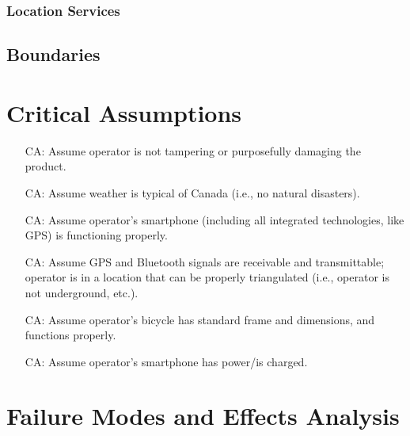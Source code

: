 \documentclass{article}
\newcounter{canum} %
\begin{document}
\subsubsection {Location Services}
\subsection {Boundaries}


\section{Critical Assumptions}

\begin{itemize}

\item[CA\refstepcounter{canum}\thecanum\label{CA1}:] Assume operator is not tampering or purposefully damaging the product.
\item[CA\refstepcounter{canum}\thecanum\label{CA2}:] Assume weather is typical of Canada (i.e., no natural disasters).
\item[CA\refstepcounter{canum}\thecanum\label{CA3}:] Assume operator's smartphone (including all integrated technologies, like GPS) is functioning properly.
\item[CA\refstepcounter{canum}\thecanum\label{CA4}:] Assume GPS and Bluetooth signals are receivable and transmittable; operator is in a location that can be properly triangulated (i.e., operator is not underground, etc.). 
\item[CA\refstepcounter{canum}\thecanum\label{CA5}:] Assume operator's bicycle has standard frame and dimensions, and functions properly.
\item[CA\refstepcounter{canum}\thecanum\label{CA6}:] Assume operator's smartphone has power/is charged. 

\end{itemize}

\section{Failure Modes and Effects Analysis}

\newpage
\end{document}
